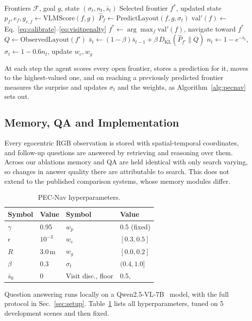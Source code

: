 \begin{algorithm}[htbp]
\caption{PEC-Nav decision cycle}
\label{alg:pecnav}
\begin{algorithmic}[1]
\REQUIRE Frontiers $\mathcal{F}$, goal $g$, state $(\sigma_t, n_t, \bar{s}_t)$
\ENSURE Selected frontier $f^*$, updated state
    \STATE $p_f, e_f, g_{r,f} \leftarrow \text{VLMScore}(f, g)$
    \STATE $\hat{P}_f \leftarrow \text{PredictLayout}(f, g, \sigma_t)$ 
    \STATE $\mathrm{val}'(f) \leftarrow$ Eq.~\ref{eq:calibrate}--\ref{eq:visitpenalty}
\ENDFOR
\STATE $f^* \leftarrow \arg\max_{f} \mathrm{val}'(f)$, navigate toward $f^*$
    \STATE $Q \leftarrow \text{ObservedLayout}(f')$ 
    \STATE $\bar{s}_t \leftarrow (1{-}\beta)\bar{s}_{t-1} + \beta \, D_{\mathrm{KL}}(\hat{P}_{f'} \| Q)$
    \STATE $n_t \leftarrow 1 - e^{-\bar{s}_t}$, \quad $\sigma_t \leftarrow 1 - 0.6 n_t$, \quad update $w_e, w_g$
\ENDIF
\end{algorithmic}
\end{algorithm}

At each step the agent scores every open frontier, stores a prediction for it, moves to the highest-valued one, and on reaching a previously predicted frontier measures the surprise and updates $\sigma_t$ and the weights, as Algorithm~\ref{alg:pecnav} sets out.

\subsection{Memory, QA and Implementation}
\label{sec:memory}

Every egocentric RGB observation is stored with spatial-temporal coordinates, and follow-up questions are answered by retrieving and reasoning over them. Across our ablations memory and QA are held identical with only search varying, so changes in answer quality there are attributable to search. This does not extend to the published comparison systems, whose memory modules differ.

\begin{table}[htbp]
\centering
\caption{PEC-Nav hyperparameters.}
\label{tab:hyperparams}
\footnotesize
\setlength{\tabcolsep}{4pt}
\begin{tabular}{@{}ll|ll@{}}
\toprule
\textbf{Symbol} & \textbf{Value} & \textbf{Symbol} & \textbf{Value} \\
\midrule
$\gamma$ & 0.95 & $w_p$ & 0.5 (fixed) \\
$\epsilon$ & $10^{-3}$ & $w_e$ & $[0.3, 0.5]$ \\
$R$ & 3.0\,m & $w_g$ & $[0.0, 0.2]$ \\
$\beta$ & 0.3 & $\sigma_t$ & $(0.4, 1.0]$ \\
$\bar{s}_0$ & 0 & Visit disc., floor & 0.5,\; 0.1 \\
\bottomrule
\end{tabular}
\end{table}

Question answering runs locally on a Qwen2.5-VL-7B~\cite{bai2025qwen25vl} model, with the full protocol in Sec.~\ref{sec:setup}. Table~\ref{tab:hyperparams} lists all hyperparameters, tuned on 5 development scenes and then fixed.

